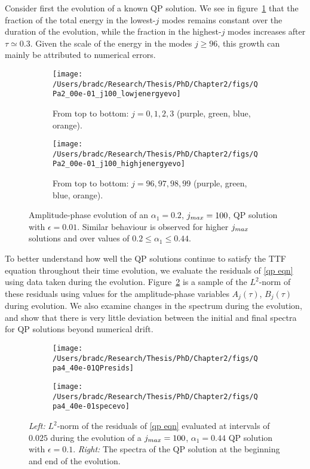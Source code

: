 \documentclass[../PhD.tex]{subfiles}
\begin{document}
Consider first the evolution of a known QP solution. We see in figure~\ref{fig:qpevo} that the fraction of the total energy in the lowest-$j$ modes remains constant over the duration of the evolution, while the fraction in the highest-$j$ modes increases after $\tau \simeq 0.3$. Given the scale of the energy in the modes $j \geq 96$, this growth can mainly be attributed to numerical errors.

\begin{figure}[h]
	\centering
	\begin{subfigure}[t]{0.45\textwidth}
		\texttt{[image: /Users/bradc/Research/Thesis/PhD/Chapter2/figs/QPa2\_00e-01\_j100\_lowjenergyevo]}
		\caption{From top to bottom: $j=0, 1, 2, 3$ (purple, green, blue, orange).}
	\end{subfigure}
	\;
	\begin{subfigure}[t]{0.45\textwidth}
		\texttt{[image: /Users/bradc/Research/Thesis/PhD/Chapter2/figs/QPa2\_00e-01\_j100\_highjenergyevo]}
		\caption{From top to bottom: $j=96, 97, 98, 99$ (purple, green, blue, orange).}
	\end{subfigure}
	\caption{Amplitude-phase evolution of an $\alpha_1 = 0.2$, $j_{max} = 100$, QP solution with $\epsilon=0.01$. Similar behaviour is observed for higher $j_{max}$ solutions and over values of $0.2 \leq \alpha_1 \leq 0.44$.}
	\label{fig:qpevo}
\end{figure}

To better understand how well the QP solutions continue to satisfy the TTF equation throughout their time evolution, we evaluate the residuals of \eqref{qp eqn} using data taken during the evolution. Figure~\ref{fig: Qpa4_40e-01QPresids} is a sample of the $L^2$-norm of these residuals using values for the amplitude-phase variables $A_j(\tau)$, $B_j(\tau)$ during evolution. We also examine changes in the spectrum during the evolution, and show that there is very little deviation between the initial and final spectra for QP solutions beyond numerical drift.

\begin{figure}[h]
	\centering
	\begin{subfigure}[t]{0.45\textwidth}
		\texttt{[image: /Users/bradc/Research/Thesis/PhD/Chapter2/figs/Qpa4\_40e-01QPresids]}
	\end{subfigure}
	\;
	\begin{subfigure}[t]{0.45\textwidth}
		\texttt{[image: /Users/bradc/Research/Thesis/PhD/Chapter2/figs/Qpa4\_40e-01specevo]}
	\end{subfigure}
	\caption{{\it Left:} $L^2$-norm of the residuals of \eqref{qp eqn} evaluated at intervals of $0.025$ during the evolution of a $j_{max} = 100$, $\alpha_1 = 0.44$ QP solution with $\epsilon = 0.1$. {\it Right:} The spectra of the QP solution at the beginning and end of the evolution.}
	\label{fig: Qpa4_40e-01QPresids}
\end{figure}
\end{document}

